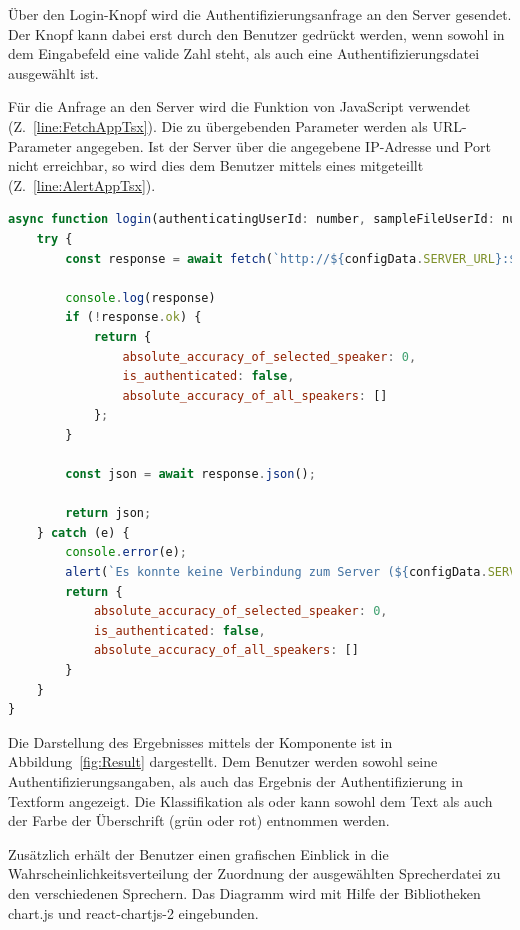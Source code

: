 Über den Login-Knopf wird die Authentifizierungsanfrage an den Server gesendet.
Der Knopf kann dabei erst durch den Benutzer gedrückt werden, wenn sowohl in dem Eingabefeld eine valide Zahl steht, als auch eine Authentifizierungsdatei ausgewählt ist.

Für die Anfrage an den Server wird die  Funktion von JavaScript verwendet (Z.~\ref{line:FetchAppTsx}).
Die zu übergebenden Parameter werden als URL-Parameter angegeben.
Ist der Server über die angegebene IP-Adresse und Port nicht erreichbar, so wird dies dem Benutzer mittels eines  mitgeteillt (Z.~\ref{line:AlertAppTsx}).
\begin{lstlisting}[language=JavaScript,caption=login() App.tsx,label=lst:LoginAppTsx]
async function login(authenticatingUserId: number, sampleFileUserId: number, sampleFileIndex: number) {
    try {
        const response = await fetch(`http://${configData.SERVER_URL}:${configData.SERVER_PORT}/?speaker_id=${sampleFileUserId}&sample_id=${sampleFileIndex}&selected_speaker_id=${authenticatingUserId}`); //(*@\label{line:FetchAppTsx}@*)
    
        console.log(response)
        if (!response.ok) {
            return { 
                absolute_accuracy_of_selected_speaker: 0,
                is_authenticated: false,
                absolute_accuracy_of_all_speakers: []
            };
        }
    
        const json = await response.json();
        
        return json;
    } catch (e) {
        console.error(e);
        alert(`Es konnte keine Verbindung zum Server (${configData.SERVER_URL}:${configData.SERVER_PORT}) hergestellt werden!`) //(*@\label{line:AlertAppTsx}@*)
        return {
            absolute_accuracy_of_selected_speaker: 0,
            is_authenticated: false,
            absolute_accuracy_of_all_speakers: []
        }
    }
}
\end{lstlisting}

Die Darstellung des Ergebnisses mittels der  Komponente ist in Abbildung~\ref{fig:Result} dargestellt.
Dem Benutzer werden sowohl seine Authentifizierungsangaben, als auch das Ergebnis der Authentifizierung in Textform angezeigt.
Die Klassifikation als  oder  kann sowohl dem Text als auch der Farbe der Überschrift (grün oder rot) entnommen werden.

Zusätzlich erhält der Benutzer einen grafischen Einblick in die Wahrscheinlichkeitsverteilung der Zuordnung der ausgewählten Sprecherdatei zu den verschiedenen Sprechern.
Das Diagramm wird mit Hilfe der Bibliotheken chart.js und react-chartjs-2 eingebunden.

